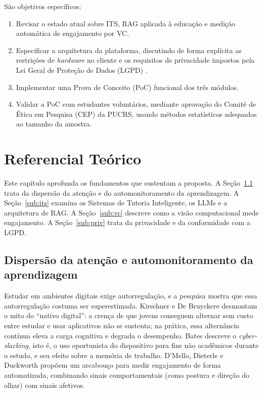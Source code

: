 \documentclass[12pt,a4paper]{article}
\begin{document}
São objetivos específicos:
\begin{enumerate}[leftmargin=*]
  \item Revisar o estado atual sobre ITS, RAG aplicada à educação e medição automática de engajamento por VC.
  \item Especificar a arquitetura da plataforma, discutindo de forma explícita as restrições de \emph{hardware} no cliente e os requisitos de privacidade impostos pela Lei Geral de Proteção de Dados (LGPD) \cite{Bra18}.
  \item Implementar uma Prova de Conceito (PoC) funcional dos três módulos.
  \item Validar a PoC com estudantes voluntários, mediante aprovação do Comitê de Ética em Pesquisa (CEP) da PUCRS, usando métodos estatísticos adequados ao tamanho da amostra.
\end{enumerate}

\section{Referencial Teórico}\label{sec:ref}

Este capítulo aprofunda os fundamentos que sustentam a proposta. A Seção~\ref{sub:aten} trata da dispersão da atenção e do automonitoramento da aprendizagem. A Seção~\ref{sub:its} examina os Sistemas de Tutoria Inteligente, os LLMs e a arquitetura de RAG. A Seção~\ref{sub:vc} descreve como a visão computacional mede engajamento. A Seção~\ref{sub:priv} trata da privacidade e da conformidade com a LGPD.

\subsection{Dispersão da atenção e automonitoramento da aprendizagem}\label{sub:aten}

Estudar em ambientes digitais exige autorregulação, e a pesquisa mostra que essa autorregulação costuma ser superestimada. Kirschner e De Bruyckere \cite{KDB17} desmontam o mito do ``nativo digital'': a crença de que jovens conseguem alternar sem custo entre estudar e usar aplicativos não se sustenta; na prática, essa alternância contínua eleva a carga cognitiva e degrada o desempenho. Bates \cite{Bat19} descreve o \emph{cyber-slacking}, isto é, o uso oportunista do dispositivo para fins não acadêmicos durante o estudo, e seu efeito sobre a memória de trabalho. D'Mello, Dieterle e Duckworth \cite{DDD17} propõem um arcabouço para medir engajamento de forma automatizada, combinando sinais comportamentais (como postura e direção do olhar) com sinais afetivos.
\end{document}
